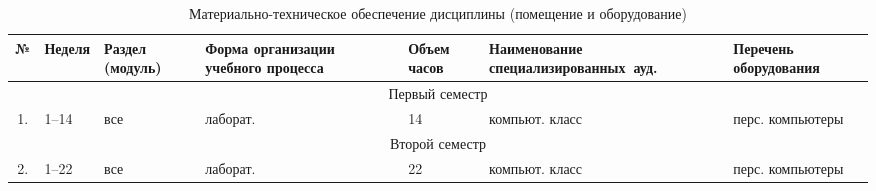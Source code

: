 \documentclass{rpd}
\begin{document}
    \begin{table}[H]
    \caption{Материально-техническое обеспечение дисциплины (помещение и оборудование)}
    \begin{tabular}{|c|>{\raggedright}p{7ex}|>{\raggedright}p{5em}|>{\raggedright}p{8em}|>{\raggedright}p{8ex}|p{14ex}|p{11ex}|}
    \hline
    № & 
    \centering Неделя & 
    \centering Раздел (модуль) & 
    \centering Форма организации учебного процесса & 
    \centering Объем часов  &    
    \centering Наименование специализированных~ауд. &
    \centering Перечень оборудования 
    \tabularnewline \hline
    \multicolumn{7}{|c|}{Первый семестр}
    \\ \hline
    1. & 1--14 & все & лаборат. & 14 & компьют. класс & перс. компьютеры 
    \\ \hline
    \multicolumn{7}{|c|}{Второй семестр}
    \\ \hline
    2. & 1--22 & все & лаборат. & 22 & компьют. класс & перс. компьютеры 
    \\ \hline\end{tabular}\end{table}

\newpage
\thispagestyle{empty}
\tableofcontents
\end{document}
